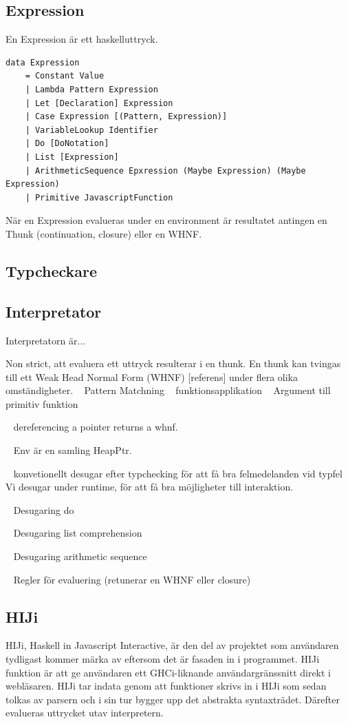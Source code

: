 \subsection{Expression}
En Expression är ett haskelluttryck.

\begin{lstlisting}
data Expression 
    = Constant Value
    | Lambda Pattern Expression
    | Let [Declaration] Expression
    | Case Expression [(Pattern, Expression)]
    | VariableLookup Identifier
    | Do [DoNotation]
    | List [Expression]
    | ArithmeticSequence Epxression (Maybe Expression) (Maybe Expression)
    | Primitive JavascriptFunction
\end{lstlisting}

När en Expression evalueras under en environment är resultatet antingen en Thunk (continuation, closure) eller en WHNF. 


\subsection{Typcheckare} 

\subsection{Interpretator}

Interpretatorn är...

Non strict, att evaluera ett uttryck resulterar i en thunk. En thunk kan tvingas till ett Weak Head Normal Form (WHNF) [referens] under flera olika omständigheter.
~ Pattern Matchning
~ funktionsapplikation
~ Argument till primitiv funktion

~ dereferencing a pointer returns a whnf.

~ Env är en samling HeapPtr.


~ konvetionellt desugar efter typchecking för att få bra felmedelanden vid typfel
Vi desugar under runtime, för att få bra möjligheter till interaktion.

~ Desugaring do

~ Desugaring list comprehension

~ Desugaring arithmetic sequence

~ Regler för evaluering (retunerar en WHNF eller closure)



\subsection{HIJi}
HIJi, Haskell in Javascript Interactive, är den del av projektet som användaren tydligast kommer märka av eftersom det är fasaden in i programmet.
HIJi funktion är att ge användaren ett GHCi-liknande användargränssnitt direkt i webläsaren. 
HIJi tar indata genom att funktioner skrivs in i HIJi som sedan tolkas av parsern och i sin tur bygger upp det abstrakta syntaxträdet. Därefter evalueras uttrycket utav interpretern.

